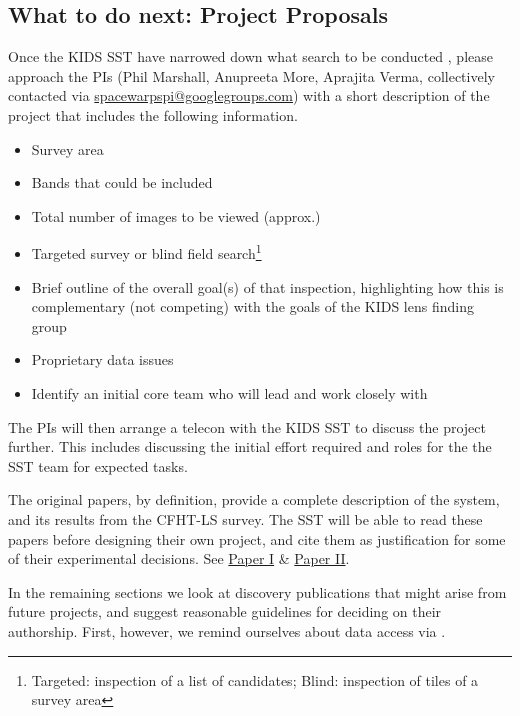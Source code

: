 \documentclass[a4paper,twocolumn]{article}
\begin{document}
\subsection{What to do next: Project Proposals}
Once the KIDS SST have narrowed down what search to be conducted \SW,
please approach the \SW PIs (Phil Marshall, Anupreeta More, Aprajita
Verma, collectively contacted via
\href{mailto:spacewarpspi@googlegroups.com}{spacewarpspi@googlegroups.com})
with a short description of the project that includes the following
information.

\begin{itemize}
\item Survey area
\item Bands that could be included
\item Total number of images to be viewed (approx.)
\item Targeted survey or blind field search\footnote{Targeted: inspection of a list of candidates; Blind: inspection of tiles of a survey area}
\item Brief outline of the overall goal(s) of that inspection, highlighting how this is complementary (not competing) with the goals of the KIDS lens finding group
\item Proprietary data issues 
\item Identify an initial core team who will lead and work closely with \SW
\end{itemize}


The \SW PIs will then arrange a telecon with the KIDS SST to discuss
the project further. This includes discussing the initial effort
required and roles for the the SST team for expected tasks.

The original \SW papers, by definition, provide a complete description of the system, and its results from the CFHT-LS survey. The SST will be able
to read these papers before designing their own \SW project, and cite them as justification for some of their experimental decisions. 
See \href{https://github.com/drphilmarshall/SpaceWarps/raw/master/doc/sw-system-published.pdf}{Paper I} \& \href{https://github.com/drphilmarshall/SpaceWarps/raw/master/doc/sw-cfhtls-published.pdf}{Paper II}.



In the remaining sections we look at discovery publications that might
arise from future \SW projects, and suggest reasonable guidelines for
deciding on their authorship. First, however, we remind ourselves about data
access via \SW.
\end{document}
